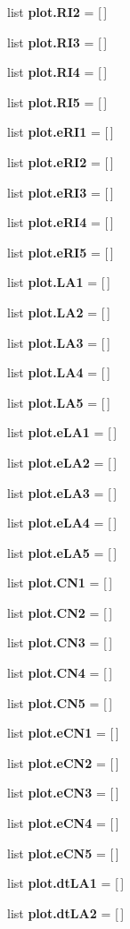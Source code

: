 \begin{DoxyCompactItemize}
list \textbf{ plot.\+R\+I2} = [$\,$]
\item 
list \textbf{ plot.\+R\+I3} = [$\,$]
\item 
list \textbf{ plot.\+R\+I4} = [$\,$]
\item 
list \textbf{ plot.\+R\+I5} = [$\,$]
\item 
list \textbf{ plot.\+e\+R\+I1} = [$\,$]
\item 
list \textbf{ plot.\+e\+R\+I2} = [$\,$]
\item 
list \textbf{ plot.\+e\+R\+I3} = [$\,$]
\item 
list \textbf{ plot.\+e\+R\+I4} = [$\,$]
\item 
list \textbf{ plot.\+e\+R\+I5} = [$\,$]
\item 
list \textbf{ plot.\+L\+A1} = [$\,$]
\item 
list \textbf{ plot.\+L\+A2} = [$\,$]
\item 
list \textbf{ plot.\+L\+A3} = [$\,$]
\item 
list \textbf{ plot.\+L\+A4} = [$\,$]
\item 
list \textbf{ plot.\+L\+A5} = [$\,$]
\item 
list \textbf{ plot.\+e\+L\+A1} = [$\,$]
\item 
list \textbf{ plot.\+e\+L\+A2} = [$\,$]
\item 
list \textbf{ plot.\+e\+L\+A3} = [$\,$]
\item 
list \textbf{ plot.\+e\+L\+A4} = [$\,$]
\item 
list \textbf{ plot.\+e\+L\+A5} = [$\,$]
\item 
list \textbf{ plot.\+C\+N1} = [$\,$]
\item 
list \textbf{ plot.\+C\+N2} = [$\,$]
\item 
list \textbf{ plot.\+C\+N3} = [$\,$]
\item 
list \textbf{ plot.\+C\+N4} = [$\,$]
\item 
list \textbf{ plot.\+C\+N5} = [$\,$]
\item 
list \textbf{ plot.\+e\+C\+N1} = [$\,$]
\item 
list \textbf{ plot.\+e\+C\+N2} = [$\,$]
\item 
list \textbf{ plot.\+e\+C\+N3} = [$\,$]
\item 
list \textbf{ plot.\+e\+C\+N4} = [$\,$]
\item 
list \textbf{ plot.\+e\+C\+N5} = [$\,$]
\item 
list \textbf{ plot.\+dt\+L\+A1} = [$\,$]
\item 
list \textbf{ plot.\+dt\+L\+A2} = [$\,$]

\end{DoxyCompactItemize}
